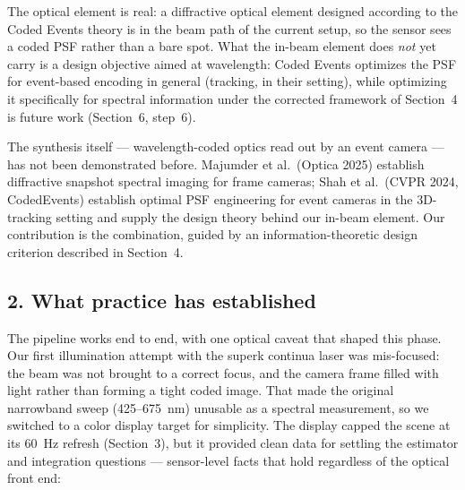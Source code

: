 \documentclass[11pt,a4paper]{article}
\newcommand{\heading}[1]{\subsection*{\color{reportblue}#1}}
\begin{document}
The optical element is real: a diffractive optical element designed according to the
Coded Events theory is in the beam path of the current setup, so the sensor sees a
coded PSF rather than a bare spot. What the in-beam element does \emph{not} yet carry
is a design objective aimed at wavelength: Coded Events optimizes the PSF for
event-based encoding in general (tracking, in their setting), while optimizing it
specifically for spectral information under the corrected framework of Section~4 is
future work (Section~6, step~6).

The synthesis itself --- wavelength-coded optics read out by an event camera --- has
not been demonstrated before. Majumder et al.\ (Optica 2025) establish diffractive
snapshot spectral imaging for frame cameras; Shah et al.\ (CVPR 2024, CodedEvents)
establish optimal PSF engineering for event cameras in the 3D-tracking setting and
supply the design theory behind our in-beam element. Our contribution is the
combination, guided by an information-theoretic design criterion described in
Section~4.

\heading{2. What practice has established}

The pipeline works end to end, with one optical caveat that shaped this phase. Our
first illumination attempt with the superk continua laser was mis-focused: the beam
was not brought to a correct focus, and the camera frame filled with light rather
than forming a tight coded image. That made the original narrowband sweep
(425--675~nm) unusable as a spectral measurement, so we switched to a color display
target for simplicity. The display capped the scene at its 60~Hz refresh
(Section~3), but it provided clean data for settling the estimator and integration
questions --- sensor-level facts that hold regardless of the optical front end:
\end{document}
